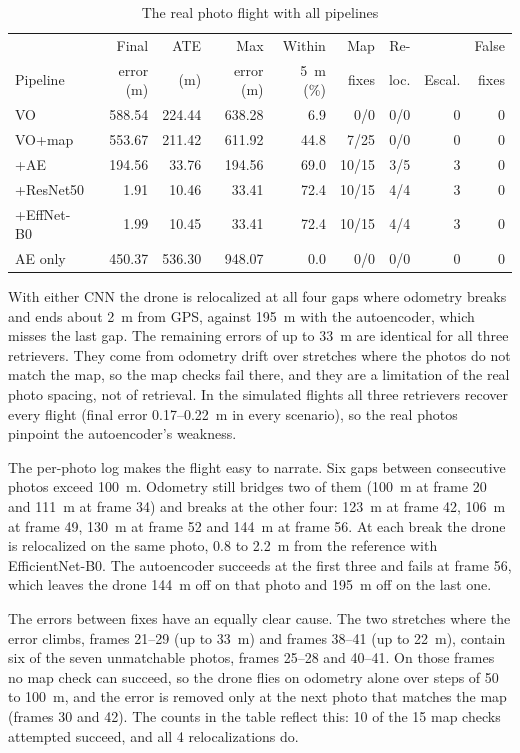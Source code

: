 \documentclass[english, Lau, oneside]{sapthesis}%
\begin{document}
\begin{table}[!htbp]
  \centering
  \caption{The real photo flight with all pipelines}
  \label{tab:reloc-all-real}
  \small\setlength{\tabcolsep}{3pt}
  \begin{tabular}{lrrrrrrrr}
    \toprule
    & Final & ATE & Max & Within & Map & Re- & & False \\
    Pipeline & error (m) & (m) & error (m) & 5~m (\%) & fixes & loc. & Escal. & fixes \\
    \midrule
    VO & 588.54 & 224.44 & 638.28 & 6.9 & 0/0 & 0/0 & 0 & 0 \\
    VO+map & 553.67 & 211.42 & 611.92 & 44.8 & 7/25 & 0/0 & 0 & 0 \\
    +AE & 194.56 & 33.76 & 194.56 & 69.0 & 10/15 & 3/5 & 3 & 0 \\
    +ResNet50 & 1.91 & 10.46 & 33.41 & 72.4 & 10/15 & 4/4 & 3 & 0 \\
    +EffNet-B0 & 1.99 & 10.45 & 33.41 & 72.4 & 10/15 & 4/4 & 3 & 0 \\
    AE only & 450.37 & 536.30 & 948.07 & 0.0 & 0/0 & 0/0 & 0 & 0 \\
    \bottomrule
  \end{tabular}
\end{table}

With either CNN the drone is relocalized at all four gaps where odometry breaks and ends about 2~m from GPS, against 195~m with the autoencoder, which misses the last gap. The remaining errors of up to 33~m are identical for all three retrievers. They come from odometry drift over stretches where the photos do not match the map, so the map checks fail there, and they are a limitation of the real photo spacing, not of retrieval. In the simulated flights all three retrievers recover every flight (final error 0.17--0.22~m in every scenario), so the real photos pinpoint the autoencoder's weakness.

The per-photo log makes the flight easy to narrate. Six gaps between consecutive photos exceed 100~m. Odometry still bridges two of them (100~m at frame 20 and 111~m at frame 34) and breaks at the other four: 123~m at frame 42, 106~m at frame 49, 130~m at frame 52 and 144~m at frame 56. At each break the drone is relocalized on the same photo, 0.8 to 2.2~m from the reference with EfficientNet-B0. The autoencoder succeeds at the first three and fails at frame 56, which leaves the drone 144~m off on that photo and 195~m off on the last one.

The errors between fixes have an equally clear cause. The two stretches where the error climbs, frames 21--29 (up to 33~m) and frames 38--41 (up to 22~m), contain six of the seven unmatchable photos, frames 25--28 and 40--41. On those frames no map check can succeed, so the drone flies on odometry alone over steps of 50 to 100~m, and the error is removed only at the next photo that matches the map (frames 30 and 42). The counts in the table reflect this: 10 of the 15 map checks attempted succeed, and all 4 relocalizations do.
\end{document}
